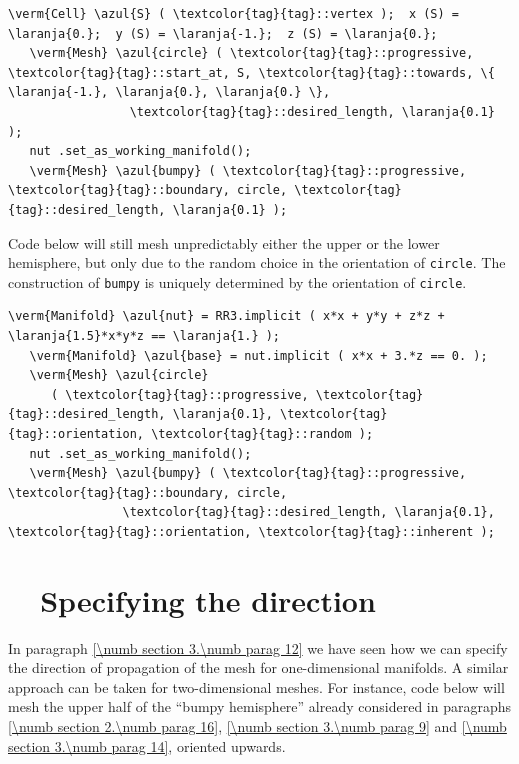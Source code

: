 \begin{Verbatim}[commandchars=\\\{\},formatcom=\small\tt,
   baselinestretch=0.94,framesep=2mm                     ]
   \verm{Cell} \azul{S} ( \textcolor{tag}{tag}::vertex );  x (S) = \laranja{0.};  y (S) = \laranja{-1.};  z (S) = \laranja{0.};
   \verm{Mesh} \azul{circle} ( \textcolor{tag}{tag}::progressive, \textcolor{tag}{tag}::start_at, S, \textcolor{tag}{tag}::towards, \{ \laranja{-1.}, \laranja{0.}, \laranja{0.} \},
                 \textcolor{tag}{tag}::desired_length, \laranja{0.1}                                          );
   nut .set_as_working_manifold();
   \verm{Mesh} \azul{bumpy} ( \textcolor{tag}{tag}::progressive, \textcolor{tag}{tag}::boundary, circle, \textcolor{tag}{tag}::desired_length, \laranja{0.1} );
\end{Verbatim}

Code below will still mesh unpredictably either the upper or the lower
hemisphere, but only due to the random choice in the orientation of {\small\tt circle}.
The construction of {\small\tt bumpy} is uniquely determined by the orientation of
{\small\tt circle}.

\begin{Verbatim}[commandchars=\\\{\},formatcom=\small\tt,
   baselinestretch=0.94,framesep=2mm                      ]
   \verm{Manifold} \azul{nut} = RR3.implicit ( x*x + y*y + z*z + \laranja{1.5}*x*y*z == \laranja{1.} );
   \verm{Manifold} \azul{base} = nut.implicit ( x*x + 3.*z == 0. );
   \verm{Mesh} \azul{circle}
      ( \textcolor{tag}{tag}::progressive, \textcolor{tag}{tag}::desired_length, \laranja{0.1}, \textcolor{tag}{tag}::orientation, \textcolor{tag}{tag}::random );
   nut .set_as_working_manifold();
   \verm{Mesh} \azul{bumpy} ( \textcolor{tag}{tag}::progressive, \textcolor{tag}{tag}::boundary, circle,
                \textcolor{tag}{tag}::desired_length, \laranja{0.1}, \textcolor{tag}{tag}::orientation, \textcolor{tag}{tag}::inherent );
\end{Verbatim}


\section{~~Specifying the direction}\label{\numb section 3.\numb parag 15}

In paragraph \ref{\numb section 3.\numb parag 12} we have seen how we can specify the direction
of propagation of the mesh for one-dimensional manifolds.
A similar approach can be taken for two-dimensional meshes.
For instance, code below will mesh the upper half of the ``bumpy hemisphere'' already considered
in paragraphs \ref{\numb section 2.\numb parag 16}, \ref{\numb section 3.\numb parag 9} and
\ref{\numb section 3.\numb parag 14}, oriented upwards.

